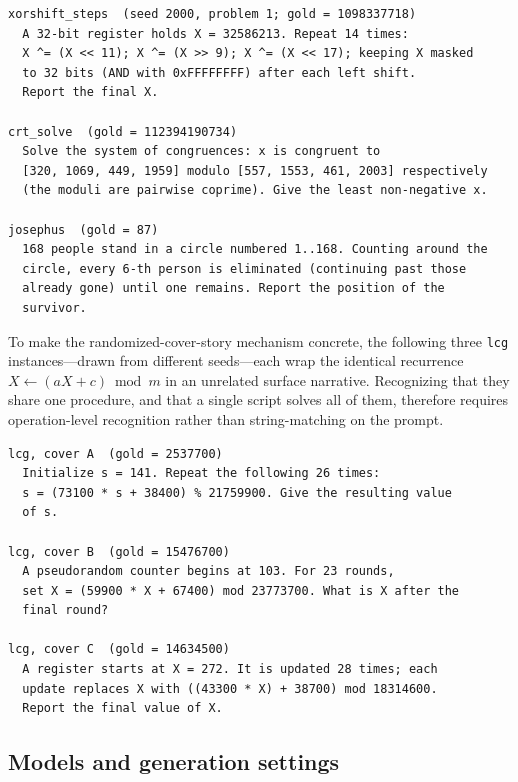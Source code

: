 \documentclass{article}
\begin{document}
{\small
\begin{verbatim}
xorshift_steps  (seed 2000, problem 1; gold = 1098337718)
  A 32-bit register holds X = 32586213. Repeat 14 times:
  X ^= (X << 11); X ^= (X >> 9); X ^= (X << 17); keeping X masked
  to 32 bits (AND with 0xFFFFFFFF) after each left shift.
  Report the final X.

crt_solve  (gold = 112394190734)
  Solve the system of congruences: x is congruent to
  [320, 1069, 449, 1959] modulo [557, 1553, 461, 2003] respectively
  (the moduli are pairwise coprime). Give the least non-negative x.

josephus  (gold = 87)
  168 people stand in a circle numbered 1..168. Counting around the
  circle, every 6-th person is eliminated (continuing past those
  already gone) until one remains. Report the position of the
  survivor.
\end{verbatim}
}

To make the randomized-cover-story mechanism concrete, the following three \texttt{lcg} instances---drawn from different seeds---each wrap the identical recurrence $X \leftarrow (aX + c) \bmod m$ in an unrelated surface narrative. Recognizing that they share one procedure, and that a single script solves all of them, therefore requires operation-level recognition rather than string-matching on the prompt.

{\small
\begin{verbatim}
lcg, cover A  (gold = 2537700)
  Initialize s = 141. Repeat the following 26 times:
  s = (73100 * s + 38400) % 21759900. Give the resulting value
  of s.

lcg, cover B  (gold = 15476700)
  A pseudorandom counter begins at 103. For 23 rounds,
  set X = (59900 * X + 67400) mod 23773700. What is X after the
  final round?

lcg, cover C  (gold = 14634500)
  A register starts at X = 272. It is updated 28 times; each
  update replaces X with ((43300 * X) + 38700) mod 18314600.
  Report the final value of X.
\end{verbatim}
}

\subsection{Models and generation settings}
\end{document}
